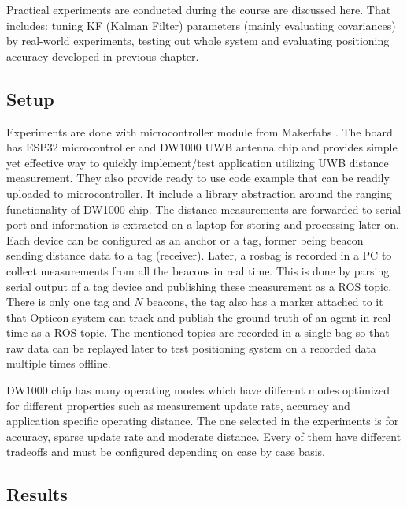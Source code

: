 Practical experiments are conducted during the course are discussed here. That includes: tuning KF (Kalman Filter) parameters (mainly evaluating covariances) by real-world experiments, testing out whole system and evaluating positioning accuracy developed in previous chapter.

\subsection{Setup}

Experiments are done with microcontroller module from Makerfabs \cite{makerfabs}. The board has ESP32 microcontroller and DW1000 UWB antenna chip and provides simple yet effective way to quickly implement/test application utilizing UWB distance measurement. They also provide ready to use code example that can be readily uploaded to microcontroller. It include a library abstraction around the ranging functionality of DW1000 chip. The distance measurements are forwarded to serial port and information is extracted on a laptop for storing and processing later on. Each device can be configured as an anchor or a tag, former being beacon sending distance data to a tag (receiver). Later, a rosbag is recorded in a PC to collect measurements from all the beacons in real time. This is done by parsing serial output of a tag device and publishing these measurement as a ROS topic. There is only one tag and $N$ beacons, the tag also has a marker attached to it that Opticon system can track and publish the ground truth of an agent in real-time as a ROS topic. The mentioned topics are recorded in a single bag so that raw data can be replayed later to test positioning system on a recorded data multiple times offline.

DW1000 chip has many operating modes which have different modes optimized for different properties such as measurement update rate, accuracy and application specific operating distance. The one selected in the experiments is for accuracy, sparse update rate and moderate distance. Every of them have different tradeoffs and must be configured depending on case by case basis.

\subsection{Results}


